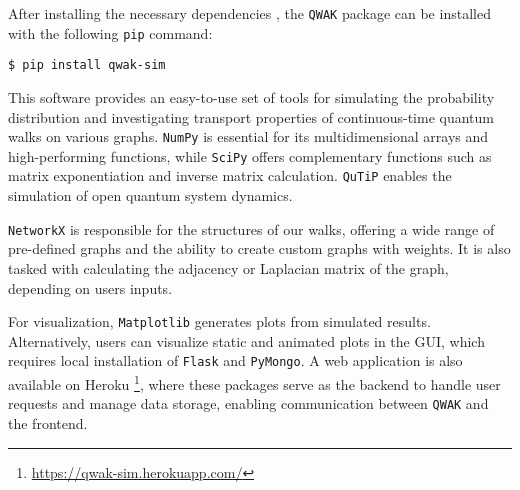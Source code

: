 \documentclass[../../dissertation.tex]{subfiles}
\begin{document}
After installing the necessary dependencies , the \texttt{QWAK} package can be
installed with the following \texttt{pip} command:

\begin{lstlisting}[style=commands]
$ pip install qwak-sim
\end{lstlisting}

This software provides an easy-to-use set of tools for simulating the
probability distribution and investigating transport properties of
continuous-time quantum walks on various graphs. \texttt{NumPy} is essential
for its multidimensional arrays and high-performing functions, while
\texttt{SciPy} offers complementary functions such as matrix exponentiation and
inverse matrix calculation. \texttt{QuTiP} enables the simulation of open
quantum system dynamics.\par

\texttt{NetworkX} is responsible for the structures of our walks, offering a
wide range of pre-defined graphs and the ability to create custom graphs with
weights. It is also tasked with calculating the adjacency or Laplacian matrix
of the graph, depending on users inputs.\par 

For visualization, \texttt{Matplotlib} generates plots from simulated results.
Alternatively, users can visualize static and animated plots in the GUI, which
requires local installation of \texttt{Flask} and \texttt{PyMongo}. A web
application is also available on Heroku
\footnote{\url{https://qwak-sim.herokuapp.com/}}, where these packages serve as
the backend to handle user requests and manage data storage, enabling
communication between \texttt{QWAK} and the frontend.
\end{document}
